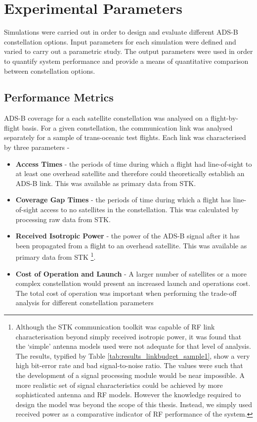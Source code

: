 \section{Experimental Parameters}
Simulations were carried out in order to design and evaluate different ADS-B constellation options. Input parameters for each simulation were defined and varied to carry out a parametric study. The output parameters were used in order to quantify system performance and provide a means of quantitative comparison between constellation options.
\subsection{Performance Metrics}
\label{sec:perfMetrics}
ADS-B coverage for a each satellite constellation was analysed on a flight-by-flight basis. For a given constellation, the communication link was analysed separately for a sample of trans-oceanic test flights. Each link was characterised by three parameters -
\begin{itemize}
	\item \textbf{Access Times} - the periods of time during which a flight had line-of-sight to at least one overhead satellite and therefore could theoretically establish an ADS-B link. This was available as primary data from STK.
	\item \textbf{Coverage Gap Times} - the periods of time during which a flight has line-of-sight access to no satellites in the constellation. This was calculated by processing raw data from STK.
	\item \textbf{Received Isotropic Power} - the power of the ADS-B signal after it has been propagated from a flight to an overhead satellite. This was available as primary data from STK \footnote{Although the STK communication toolkit was capable of RF link characterisation beyond simply received isotropic power, it was found that the `simple' antenna models used were not adequate for that level of analysis. The results, typified by Table \ref{tab:results_linkbudget_sample1}, show a very high bit-error rate and bad signal-to-noise ratio. The values were such that the development of a signal processing module would be near impossible. A more realistic set of signal characteristics could be achieved by more sophisticated antenna and RF models. However the knowledge required to design the model was beyond the scope of this thesis. Instead, we simply used received power as a comparative indicator of RF performance of the system.}.
	\item \textbf{Cost of Operation and Launch} - A larger number of satellites or a more complex constellation would present an increased launch and operations cost. The total cost of operation was important when performing the trade-off analysis for different constellation parameters
\end{itemize}

